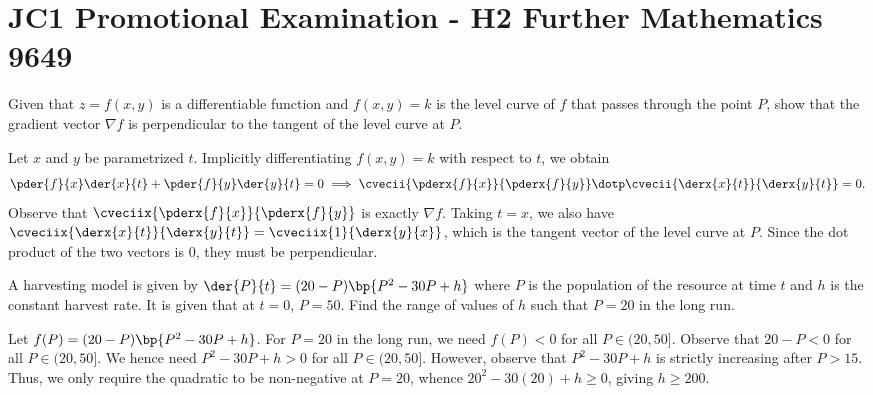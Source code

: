\section{JC1 Promotional Examination - H2 Further Mathematics 9649}

\begin{problem}
    Given that $z = f(x, y)$ is a differentiable function and $f(x, y) = k$ is the level curve of $f$ that passes through the point $P$, show that the gradient vector $\nabla f$ is perpendicular to the tangent of the level curve at $P$.
\end{problem}
\begin{solution}
    Let $x$ and $y$ be parametrized $t$. Implicitly differentiating $f(x, y) = k$ with respect to $t$, we obtain \[\pder{f}{x} \der{x}{t} + \pder{f}{y} \der{y}{t} = 0 \implies \cvecii{\pderx{f}{x}}{\pderx{f}{y}} \dotp \cvecii{\derx{x}{t}}{\derx{y}{t}} = 0.\] Observe that $\cveciix{\pderx{f}{x}}{\pderx{f}{y}}$ is exactly $\nabla f$. Taking $t = x$, we also have $\cveciix{\derx{x}{t}}{\derx{y}{t}} = \cveciix{1}{\derx{y}{x}}$, which is the tangent vector of the level curve at $P$. Since the dot product of the two vectors is 0, they must be perpendicular.
\end{solution}

\begin{problem}
    A harvesting model is given by $\der{P}{t} = (20-P)\bp{P^2 - 30 P + h}$ where $P$ is the population of the resource at time $t$ and $h$ is the constant harvest rate. It is given that at $t = 0$, $P = 50$. Find the range of values of $h$ such that $P=20$ in the long run.
\end{problem}
\begin{solution}
    Let $f(P) = (20-P)\bp{P^2 - 30 P + h}$. For $P = 20$ in the long run, we need $f(P) < 0$ for all $P \in (20, 50]$. Observe that $20 -P < 0$ for all $P \in (20, 50]$. We hence need $P^2 - 30 P + h > 0$ for all $P \in (20, 50]$. However, observe that $P^2 - 30P + h$ is strictly increasing after $P > 15$. Thus, we only require the quadratic to be non-negative at $P = 20$, whence $20^2 - 30(20) + h \geq 0$, giving $h \geq 200$.
\end{solution}

